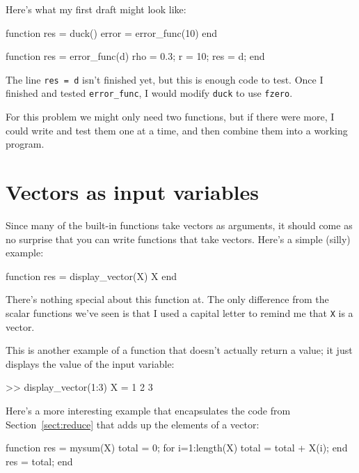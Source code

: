 \documentclass[
]{book}
\numberwithin{Answer}{chapter}
\numberwithin{Exercise}{chapter}
\begin{document}

Here's what my first draft might look like:

\begin{code}
function res = duck()
    error = error_func(10)
end

function res = error_func(d)
    rho = 0.3;      %
    r = 10;         %
    res = d;
end
\end{code}

The line {\tt res = d} isn't finished yet, but this
is enough code to test.
Once I finished and tested {\tt error\_func}, I would modify
{\tt duck} to use {\tt fzero}.

For this problem we might only need two functions, but if there
were more, I could write and test them one at a time, and then
combine them into a working program.


\section{Vectors as input variables}

Since many of the built-in functions take vectors as arguments,
it should come as no surprise that you can write functions that
take vectors.  Here's a simple (silly) example:


\begin{code}
function res = display_vector(X)
    X
end
\end{code}

There's nothing special about this function at.  The only
difference from the scalar functions we've seen is that I used
a capital letter to remind me that {\tt X} is a vector.

This is another example of a function that doesn't actually return a value; it just displays the value of the input variable:

\begin{code}
>> display_vector(1:3)
X = 1     2     3
\end{code}

Here's a more interesting example that encapsulates the code
from Section~\ref{sect:reduce} that adds up the elements of a vector:


\begin{code}
function res = mysum(X)
    total = 0;
    for i=1:length(X)
        total = total + X(i);
    end
    res = total;
end
\end{code}
\end{document}
